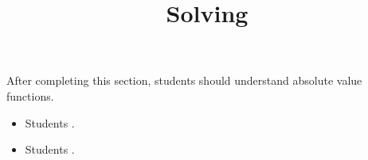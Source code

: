\documentclass{ximera}
\title{Solving}
\begin{document}
\begin{abstract}
\end{abstract}

\maketitle

\begin{sectionOutcomes}

After completing this section, students should understand absolute value functions. 

\begin{itemize}
\item Students .
\item Students .
\end{itemize}

\end{sectionOutcomes}
\end{document}
